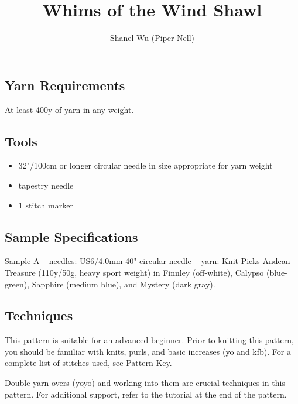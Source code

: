 \documentclass[12pt]{article}
\title{Whims of the Wind Shawl}
\author{Shanel Wu (Piper Nell)}
\begin{document}
\begin{titlingpage}
\begin{multicols}{2}


\section*{\thetitle}
\vspace{-0.5em}
\subsubsection*{\theauthor}

\subsection*{Yarn Requirements}

At least 400y of yarn in any weight.

\subsection*{Tools}

\begin{itemize}
\item 32"/100cm or longer circular needle in size appropriate for yarn weight
\item tapestry needle
\item 1 stitch marker
\end{itemize}

\subsection*{Sample Specifications}

Sample A -- needles: US6/4.0mm 40" circular needle -- yarn: Knit Picks Andean Treasure (110y/50g, heavy sport weight) in Finnley (off-white), Calypso (blue-green), Sapphire (medium blue), and Mystery (dark gray).

\subsection*{Techniques}

This pattern is suitable for an advanced beginner. Prior to knitting this pattern, you should be familiar with knits, purls, and basic increases (yo and kfb). For a complete list of stitches used, see Pattern Key.

\vspace{1em}
Double yarn-overs (yoyo) and working into them are crucial techniques in this pattern. For additional support, refer to the tutorial at the end of the pattern.


\end{multicols}
\end{titlingpage}
\end{document}
